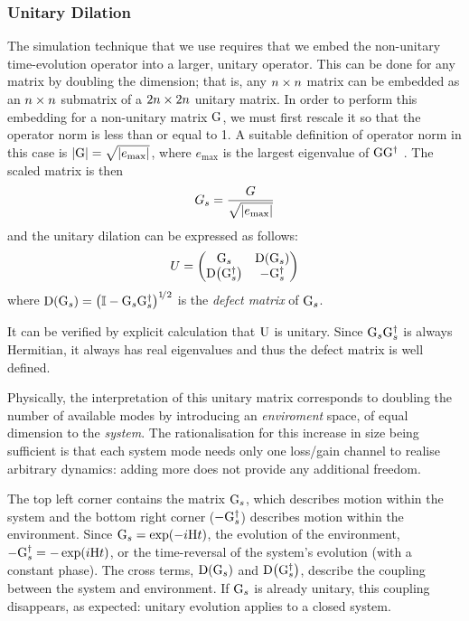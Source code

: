 \subsubsection{Unitary Dilation}
The simulation technique that we use requires that we embed the non-unitary
time-evolution operator into a larger, unitary operator. This can be done for
any matrix by doubling the dimension; that is, any \(n \times n\) matrix can be
embedded as an \(n \times n\) submatrix of a \(2n \times 2n\) unitary matrix. In order
to perform this embedding for a non-unitary matrix \(\mathrm{G}\), we must first
rescale it so that the operator norm is less than or equal to 1. A suitable
definition of operator norm in this case is \(\left|\mathrm{G}\right| = \sqrt{\left|e_{
\text{max}}\right|}\), where \(e_{\text{max}}\) is the largest eigenvalue of 
\(\mathrm{GG^{\dagger}}\) \cite{dilation}. The scaled matrix is then
\begin{equation}
  G_{s} = \frac{G}{\sqrt{\left|e_{\text{max}}\right|}}
\end{equation}
and the unitary dilation can be expressed as follows:
\begin{equation}
  U = \begin{pmatrix}
    \mathrm{G}_{s} & \mathrm{D}\!\left(\mathrm{G}_{s}\right) \\
    \mathrm{D}\!\left(\mathrm{G}_{s}^{\dagger}\right) & -\mathrm{G}_{s}^{\dagger} \end{pmatrix}
\end{equation}
where \(\mathrm{D}\!\left(\mathrm{G}_{s}\right) = \left( \mathbb{I} - \mathrm{G}_{s}\mathrm{G}_{s}^{
\dagger} \right)^{1\!/2}
\) is the \emph{defect matrix} of \(\mathrm{G}_{s}\).

It can be verified by explicit calculation that \(\mathrm{U}\) is unitary.
Since \(\mathrm{G}_{s}\mathrm{G}_{s}^{\dagger}\) is always Hermitian, it always has
real eigenvalues and thus the defect matrix is well defined.

Physically, the interpretation of this unitary matrix corresponds to doubling
the number of available modes by introducing an \emph{enviroment} space, of
equal dimension to the \emph{system}. The rationalisation for this increase in
size being sufficient is that each system mode needs only one loss/gain channel
to realise arbitrary dynamics: adding more does not provide any additional
freedom.

The top left corner contains the matrix
\(\mathrm{G}_{s}\), which describes motion within the system and the bottom right
corner (\(-\mathrm{G}_{s}^{\dagger}\)) describes motion within the environment.
Since \(\mathrm{G}_{s}=\exp \!\left(-i\mathrm{H}t\right)\), the evolution of the environment,
\(\mathrm{-G}_{s}^{\dagger}=-\exp \!\left(i\mathrm{H}t\right)\), or the time-reversal of the
system's evolution (with a constant phase). The cross terms, \(\mathrm{D}
\!\left(\mathrm{G}_{s}\right)\) and \(\mathrm{D} \!\left(\mathrm{G}_{s}^{
\dagger}\right) \), describe the coupling between the system and environment. If
\(\mathrm{G}_{s}\) is already unitary, this coupling disappears, as expected:
unitary evolution applies to a closed system.

